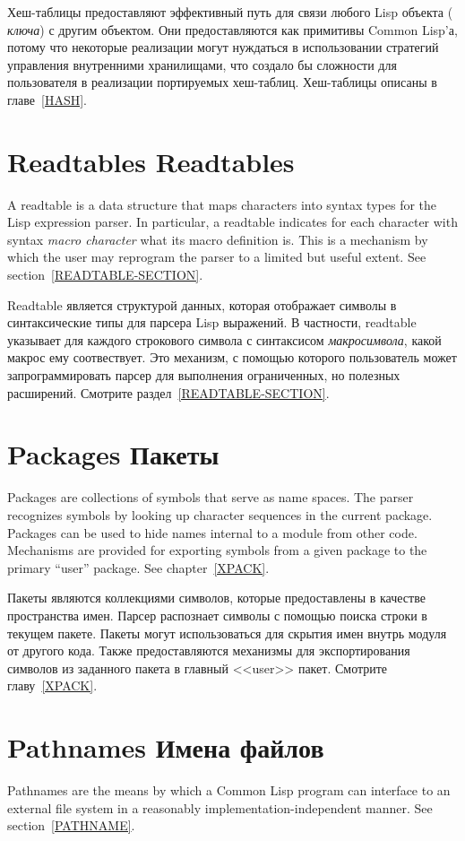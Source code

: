 Хеш-таблицы предоставляют эффективный путь для связи любого Lisp объекта ({\it
 ключа}) с другим объектом. Они предоставляются как примитивы Common Lisp'а,
потому что некоторые реализации могут нуждаться в использовании стратегий
управления внутренними хранилищами, что создало бы сложности для пользователя в
реализации портируемых хеш-таблиц.
Хеш-таблицы описаны в главе~\ref{HASH}.

\section{Readtables Readtables}

A readtable is a data structure that maps characters into syntax
types for the Lisp expression parser.
In particular, a readtable indicates for
each character with syntax \emph{macro character} what its macro
definition is.  This is a mechanism by which the user may reprogram
the parser to a limited but useful extent.
See section~\ref{READTABLE-SECTION}.

Readtable является структурой данных, которая отображает символы в
синтаксические типы для парсера Lisp выражений.
В частности, readtable указывает для каждого строкового символа с синтаксисом
\emph{макросимвола}, какой макрос ему соотвествует. Это механизм, с помощью
которого пользователь может запрограммировать парсер для выполнения
ограниченных, но полезных расширений.
Смотрите раздел~\ref{READTABLE-SECTION}.

\section{Packages Пакеты}

Packages are collections of symbols that serve as name spaces.
The parser recognizes symbols by looking up character sequences
in the current package.  Packages can be used to hide
names internal to a module from other code.  Mechanisms are provided
for exporting symbols from a given package to the primary ``user'' package.
See chapter~\ref{XPACK}.

Пакеты являются коллекциями символов, которые предоставлены в качестве
пространства имен. Парсер распознает символы с помощью поиска строки в текущем
пакете. Пакеты могут использоваться для скрытия имен внутрь модуля от другого
кода. Также предоставляются механизмы для экспортирования символов из заданного
пакета в главный <<user>> пакет.
Смотрите главу~\ref{XPACK}.

\section{Pathnames Имена файлов}
Pathnames are the means by which a Common Lisp program can
interface to an external file system in a reasonably implementation-independent
manner.  See section~\ref{PATHNAME}.


